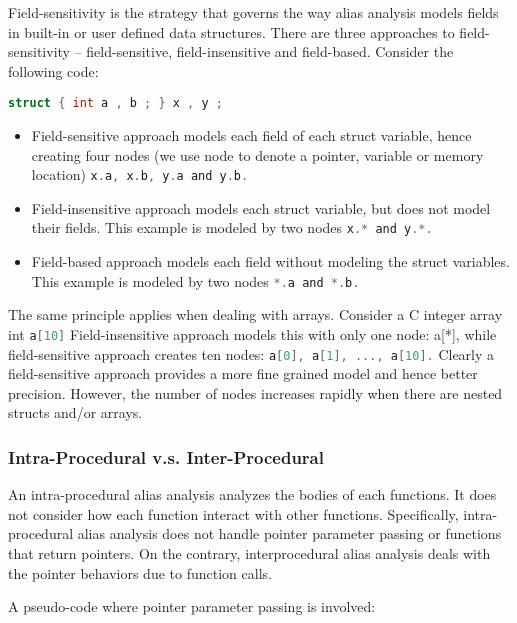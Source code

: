 Field-sensitivity is the strategy that governs the way alias analysis models fields in built-in or
user defined data structures. There are three approaches to field-sensitivity – field-sensitive,
field-insensitive and field-based. Consider the following code:

\lstinline[language=C]|struct { int a , b ; } x , y ;|



\begin{itemize}
\item Field-sensitive approach models each field of each struct variable, hence creating four nodes
(we use node to denote a pointer, variable or memory location)  \lstinline[language=C]|x.a, x.b, y.a and y.b.|

\item Field-insensitive approach models each struct variable, but does not model their fields. This
example is modeled by two nodes  \lstinline[language=C]|x.* and y.*.|

\item Field-based approach models each field without modeling the struct variables. This example
is modeled by two nodes  \lstinline[language=C]|*.a and *.b.|


\end{itemize}    

The same principle applies when dealing with arrays. Consider a C integer array int \lstinline[language=C]|a[10]|
Field-insensitive approach models this with only one node: a[*], while field-sensitive approach
creates ten nodes: \lstinline[language=C]|a[0], a[1], ..., a[10].|
Clearly a field-sensitive approach provides a more fine grained model and hence better precision. However, the number of nodes increases rapidly when there are nested structs and/or
arrays.


\subsubsection{Intra-Procedural v.s. Inter-Procedural}

An intra-procedural alias analysis analyzes the bodies of each functions. It does not consider
how each function interact with other functions. Specifically, intra-procedural alias analysis does
not handle pointer parameter passing or functions that return pointers. On the contrary, interprocedural alias analysis deals with the pointer behaviors due to function calls.

A pseudo-code where pointer parameter passing is involved:

